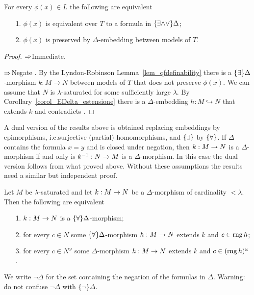 \begin{theorem}\label{thm_embeddings_preservation_E}
For every $\phi(x)\in L$ the following are equivalent
\begin{itemize}
\item[1.] $\phi(x)$ is equivalent over $T$ to a formula in $\{\exists{\wedge}{\vee}\}\Delta$;
\item[2.] $\phi(x)$ is preserved by $\Delta$-embedding between models of $T$.
\end{itemize}
\end{theorem}
\begin{proof}
$\Rightarrow$\quad Immediate. 

$\Rightarrow$\quad Negate . By the Lyndon-Robinson Lemma~\ref{lem_qfdefinability} there is a $\{\exists\}\Delta$-morphism $k:M\to N$ between models of $T$ that does not preserve $\phi(x)$. We can assume that $N$ is $\lambda$-saturated for some sufficiently large $\lambda$. By Corollary~\ref{corol_EDelta_estensione} there is a $\Delta$-embedding $h:M\hookrightarrow N$ that extends $k$ and contradicts .
\end{proof}

A dual version of the results above is obtained replacing embeddings by epimorphisms, i.e.\@ surjective (partial) homomorphisms, and $\{\exists\}$ by $\{\forall\}$. If $\Delta$ contains the formula $x=y$ and is closed under negation, then $k:M\rightarrow N$ is a $\Delta$-morphism if and only is $k^{-1}:N\rightarrow M$ is a $\Delta$-morphism. In this case the dual version follows from what proved above. Without these assumptions the results need a similar but independent proof. 


\begin{proposition}\label{prop_ADelta_estensione}
Let $M$ be $\lambda$-saturated and let $k:M\rightarrow N$ be a $\Delta$-morphism of cardinality $<\lambda$. Then the following are equivalent
\begin{itemize}
\item[1.] $k:M\rightarrow N$ is a $\{\forall\}\Delta$-morphism;
\item[2.] for every $c\in N$ some $\{\forall\}\Delta$-morphism $h:M\rightarrow N$ extends $k$ and $c\in\mathop{\rm rng} h$;
\item[3.] for every $c\in N^{\omega}$ some $\Delta$-morphism $h:M\rightarrow N$ extends $k$ and $c\in(\mathop{\rm rng} h)^{\omega}$.
\end{itemize}
\end{proposition}

We write \emph{$\neg\Delta$} for the set containing the negation of the formulas in $\Delta$. Warning: do not confuse $\neg\Delta$ with $\{\neg\}\Delta$.

